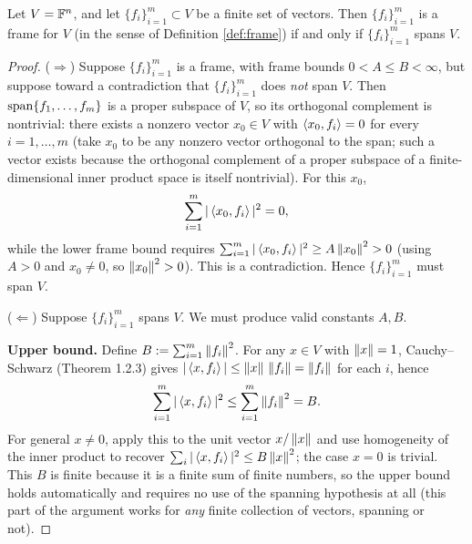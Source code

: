 \begin{theorem}
\label{thm:finite-spanning-is-frame}
Let $V = \mathbb{F}^n$, and let $\{f_i\}_{i=1}^m \subset V$ be a finite set of vectors. Then $\{f_i\}_{i=1}^m$ is a frame for $V$ (in the sense of Definition \ref{def:frame}) if and only if $\{f_i\}_{i=1}^m$ spans $V$.
\end{theorem}

\begin{proof}
($\Rightarrow$) Suppose $\{f_i\}_{i=1}^m$ is a frame, with frame bounds $0 < A \le B < \infty$, but suppose toward a contradiction that $\{f_i\}_{i=1}^m$ does \emph{not} span $V$. Then $\operatorname{span}\{f_1, \dots, f_m\}$ is a proper subspace of $V$, so its orthogonal complement is nontrivial: there exists a nonzero vector $x_0 \in V$ with $\left\langle x_0, f_i \right\rangle = 0$ for every $i = 1, \dots, m$ (take $x_0$ to be any nonzero vector orthogonal to the span; such a vector exists because the orthogonal complement of a proper subspace of a finite-dimensional inner product space is itself nontrivial). For this $x_0$,
$$
\sum_{i=1}^m |\left\langle x_0, f_i \right\rangle|^2 = 0,
$$
while the lower frame bound requires $\sum_{i=1}^m |\left\langle x_0, f_i \right\rangle|^2 \ge A \left\| x_0 \right\|^2 > 0$ (using $A > 0$ and $x_0 \ne 0$, so $\left\| x_0 \right\|^2 > 0$). This is a contradiction. Hence $\{f_i\}_{i=1}^m$ must span $V$.

($\Leftarrow$) Suppose $\{f_i\}_{i=1}^m$ spans $V$. We must produce valid constants $A, B$.

\textbf{Upper bound.} Define $B := \sum_{i=1}^m \left\| f_i \right\|^2$. For any $x \in V$ with $\left\| x \right\| = 1$, Cauchy--Schwarz (Theorem 1.2.3) gives $|\left\langle x, f_i \right\rangle| \le \left\| x \right\|\,\left\| f_i \right\| = \left\| f_i \right\|$ for each $i$, hence
$$
\sum_{i=1}^m |\left\langle x, f_i \right\rangle|^2 \le \sum_{i=1}^m \left\| f_i \right\|^2 = B.
$$
For general $x \ne 0$, apply this to the unit vector $x/\left\| x \right\|$ and use homogeneity of the inner product to recover $\sum_i |\left\langle x, f_i \right\rangle|^2 \le B\left\| x \right\|^2$; the case $x = 0$ is trivial. This $B$ is finite because it is a finite sum of finite numbers, so the upper bound holds automatically and requires no use of the spanning hypothesis at all (this part of the argument works for \emph{any} finite collection of vectors, spanning or not).


\end{proof}
